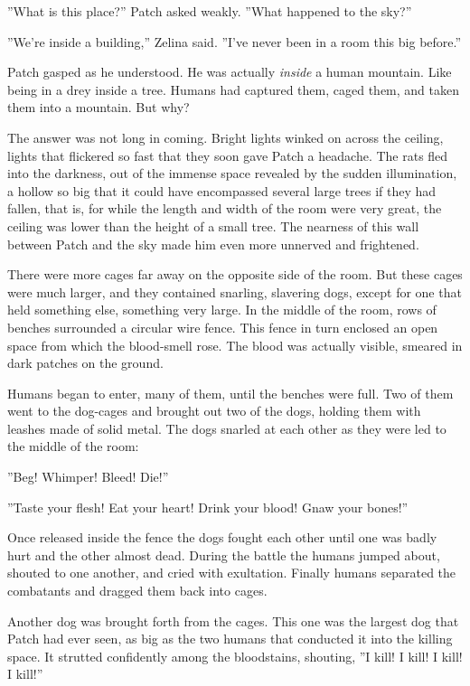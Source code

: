 \documentclass[11pt]{article}
\begin{document}
 ''What is this place?'' Patch asked weakly. ''What happened to the sky?''\par
 ''We're inside a building,'' Zelina said. ''I've never been in a room this big before.''\par
 Patch gasped as he understood. He was actually {\it inside} a human mountain. Like being in a drey inside a tree. Humans had captured them, caged them, and taken them into a mountain. But why?\par
 The answer was not long in coming. Bright lights winked on across the ceiling, lights that flickered so fast that they soon gave Patch a headache. The rats fled into the darkness, out of the immense space revealed by the sudden illumination, a hollow so big that it could have encompassed several large trees %
 if they had fallen, that is, for while the length and width of the room were very great, the ceiling was lower than the height of a small tree. The nearness of this wall between Patch and the sky made him even more unnerved and frightened.\par
 There were more cages far away on the opposite side of the room. But these cages were much larger, and they contained snarling, slavering dogs, except for one that held %
 something else, something very large. In the middle of the room, rows of benches surrounded a circular wire fence. This fence in turn enclosed an open space from which the blood-smell rose. The blood was actually visible, smeared in dark patches on the ground.\par
 Humans began to enter, many of them, until the benches were full. Two of them went to the dog-cages and brought out two of the dogs, holding them with leashes made of solid metal. The dogs snarled at each other as they were led to the middle of the room:\par
 ''Beg! Whimper! Bleed! Die!''\par
 ''Taste your flesh! Eat your heart! Drink your blood! Gnaw your bones!''\par
 Once released inside the fence the dogs fought each other until one was badly hurt and the other almost dead. During the battle the humans jumped about, shouted to one another, and cried with exultation. Finally humans separated the combatants and dragged them back into cages. \par
Another dog was brought forth from the cages. This one was the largest dog that Patch had ever seen, as big as the two humans that conducted it into the killing space. It strutted confidently among the bloodstains, shouting, ''I kill! I kill! I kill! I kill!''\par
\end{document}
